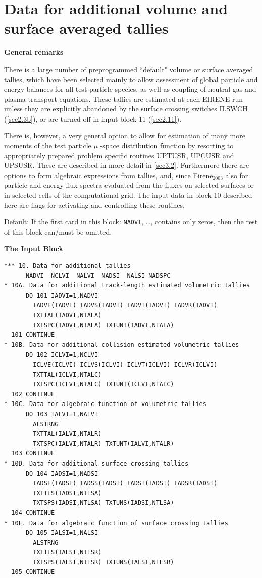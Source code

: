 \section{Data for additional volume and surface averaged tallies}
\label{sec2.10}

\textbf{General remarks} 

\medskip 

There is a large number of preprogrammed ``default" volume or surface averaged
tallies, which have been selected mainly to allow assessment of global particle
and energy balances for all test particle species, as well as coupling of
neutral gas and plasma transport equations.
These tallies are estimated at each EIRENE run unless they are explicitly
abandoned by the surface crossing switches ILSWCH (\cref{sec2.3b}), or are
turned off in input block 11 (\cref{sec2.11}).

There is, however, a very general option to allow for estimation of many more
moments of the test particle $\mu$ -space distribution function by resorting to
appropriately prepared problem specific routines UPTUSR, UPCUSR and UPSUSR.
These are described in more detail in \cref{sec3.2}.
Furthermore there are options to form algebraic expressions from tallies, and,
since Eirene$_{2003}$ also for particle and energy flux spectra evaluated from
the fluxes on selected surfaces or in selected cells of the computational grid.
The input data in block 10 described here are flags for activating and
controlling these routines.

Default: If the first card in this block: \lstinline|NADVI|, \dots,
contains only zeros, then the rest of this block can/must be omitted.

\medskip

\textbf{The Input Block} 

\begin{small}
  \begin{lstlisting}
*** 10. Data for additional tallies
      NADVI  NCLVI  NALVI  NADSI  NALSI NADSPC
* 10A. Data for additional track-length estimated volumetric tallies
      DO 101 IADVI=1,NADVI
        IADVE(IADVI) IADVS(IADVI) IADVT(IADVI) IADVR(IADVI)
        TXTTAL(IADVI,NTALA)
        TXTSPC(IADVI,NTALA) TXTUNT(IADVI,NTALA)
  101 CONTINUE
* 10B. Data for additional collision estimated volumetric tallies
      DO 102 ICLVI=1,NCLVI
        ICLVE(ICLVI) ICLVS(ICLVI) ICLVT(ICLVI) ICLVR(ICLVI)
        TXTTAL(ICLVI,NTALC)
        TXTSPC(ICLVI,NTALC) TXTUNT(ICLVI,NTALC)
  102 CONTINUE
* 10C. Data for algebraic function of volumetric tallies
      DO 103 IALVI=1,NALVI
        ALSTRNG
        TXTTAL(IALVI,NTALR)
        TXTSPC(IALVI,NTALR) TXTUNT(IALVI,NTALR)
  103 CONTINUE
* 10D. Data for additional surface crossing tallies
      DO 104 IADSI=1,NADSI
        IADSE(IADSI) IADSS(IADSI) IADST(IADSI) IADSR(IADSI)
        TXTTLS(IADSI,NTLSA)
        TXTSPS(IADSI,NTLSA) TXTUNS(IADSI,NTLSA)
  104 CONTINUE
* 10E. Data for algebraic function of surface crossing tallies
      DO 105 IALSI=1,NALSI
        ALSTRNG
        TXTTLS(IALSI,NTLSR)
        TXTSPS(IALSI,NTLSR) TXTUNS(IALSI,NTLSR)
  105 CONTINUE
\end{lstlisting}
\end{small}

